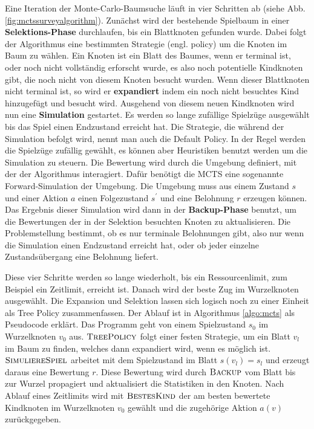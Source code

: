 Eine Iteration der Monte-Carlo-Baumsuche läuft in vier Schritten ab (siehe Abb. \ref{fig:mctssurveyalgorithm}). Zunächst wird der bestehende Spielbaum in einer \textbf{Selektions-Phase} durchlaufen, bis ein Blattknoten gefunden wurde. Dabei folgt der Algorithmus eine bestimmten Strategie (engl. policy) um die Knoten im Baum zu wählen. Ein Knoten ist ein Blatt des Baumes, wenn er terminal ist, oder noch nicht vollständig erforscht wurde, es also noch potentielle Kindknoten gibt, die noch nicht von diesem Knoten besucht wurden. Wenn dieser Blattknoten nicht terminal ist, so wird er \textbf{expandiert} indem ein noch nicht besuchtes Kind hinzugefügt und besucht wird. Ausgehend von diesem neuen Kindknoten wird nun eine \textbf{Simulation} gestartet. Es werden so lange zufällige Spielzüge ausgewählt bis das Spiel einen Endzustand erreicht hat. Die Strategie, die während der Simulation befolgt wird, nennt man auch die Default Policy. In der Regel werden die Spielzüge zufällig gewählt, es können aber Heuristiken benutzt werden um die Simulation zu steuern. Die Bewertung wird durch die Umgebung definiert, mit der der Algorithmus interagiert. Dafür benötigt die MCTS eine sogenannte Forward-Simulation der Umgebung. Die Umgebung muss aus einem Zustand $s$ und einer Aktion $a$ einen Folgezustand $s^\prime$ und eine Belohnung $r$ erzeugen können. Das Ergebnis dieser Simulation wird dann in der \textbf{Backup-Phase} benutzt, um die Bewertungen der in der Selektion besuchten Knoten zu aktualisieren. Die Problemstellung bestimmt, ob es nur terminale Belohnungen gibt, also nur wenn die Simulation einen Endzustand erreicht hat, oder ob jeder einzelne Zustandsübergang eine Belohnung liefert.

Diese vier Schritte werden so lange wiederholt, bis ein Ressourcenlimit, zum Beispiel ein Zeitlimit, erreicht ist. Danach wird der beste Zug im Wurzelknoten ausgewählt. Die Expansion und Selektion lassen sich logisch noch zu einer Einheit als Tree Policy zusammenfassen.
Der Ablauf ist in Algorithmus \ref{algo:mcts} als Pseudocode erklärt. Das Programm geht von einem Spielzustand $s_0$ im Wurzelknoten $v_0$ aus. $\textsc{TreePolicy}$ folgt einer festen Strategie, um ein Blatt $v_l$ im Baum zu finden, welches dann expandiert wird, wenn es möglich ist. $\textsc{SimuliereSpiel}$ arbeitet mit dem Spielzustand im Blatt $s(v_l) = s_l$ und erzeugt daraus eine Bewertung $r$. Diese Bewertung wird durch $\textsc{Backup}$ vom Blatt bis zur Wurzel propagiert und aktualisiert die Statistiken in den Knoten. Nach Ablauf eines Zeitlimits wird mit $\textsc{BestesKind}$ der am besten bewertete Kindknoten im Wurzelknoten $v_0$ gewählt und die zugehörige Aktion $a(v)$ zurückgegeben.

